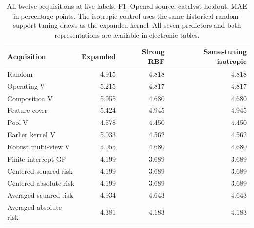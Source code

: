 \begin{table}[htbp]\centering\small
\caption{All twelve acquisitions at five labels, F1: Opened source: catalyst holdout. MAE in percentage points. The isotropic control uses the same historical random-support tuning draws as the expanded kernel. All seven predictors and both representations are available in electronic tables.}\label{tab:step10all2}
\begin{tabular}{lrrr}\toprule
Acquisition & Expanded & Strong RBF & Same-tuning isotropic \\ \midrule
Random & 4.915 & 4.818 & 4.818 \\
Operating V & 5.215 & 4.817 & 4.817 \\
Composition V & 5.055 & 4.680 & 4.680 \\
Feature cover & 5.424 & 4.945 & 4.945 \\
Pool V & 4.578 & 4.450 & 4.450 \\
Earlier kernel V & 5.033 & 4.562 & 4.562 \\
Robust multi-view V & 5.055 & 4.680 & 4.680 \\
Finite-intercept GP & 4.199 & 3.689 & 3.689 \\
Centered squared risk & 4.199 & 3.689 & 3.689 \\
Centered absolute risk & 4.199 & 3.689 & 3.689 \\
Averaged squared risk & 4.934 & 4.643 & 4.643 \\
Averaged absolute risk & 4.381 & 4.183 & 4.183 \\
\bottomrule\end{tabular}
\end{table}
